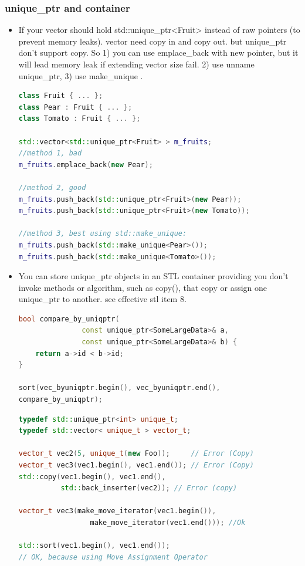 \documentclass[a4paper,12pt,twoside]{book}
\begin{document}
\subsubsection{unique\_ptr and container}
\begin{itemize}

\item If your vector should hold std::unique\_ptr<Fruit> instead of raw pointers (to prevent memory leaks). vector need copy in and copy out. but unique\_ptr don't support copy. So 1) you can use emplace\_back with new pointer, but it will lead memory leak if extending vector size fail. 2) use unname unique\_ptr, 3) use make\_unique .
\begin{lstlisting}[frame=single, language=c++]
class Fruit { ... };
class Pear : Fruit { ... };
class Tomato : Fruit { ... };

std::vector<std::unique_ptr<Fruit> > m_fruits;
//method 1, bad
m_fruits.emplace_back(new Pear);

//method 2, good
m_fruits.push_back(std::unique_ptr<Fruit>(new Pear));
m_fruits.push_back(std::unique_ptr<Fruit>(new Tomato));

//method 3, best using std::make_unique:
m_fruits.push_back(std::make_unique<Pear>());
m_fruits.push_back(std::make_unique<Tomato>());
\end{lstlisting}

\item You can store unique\_ptr objects in an STL container providing you don't invoke methods or algorithm, such as copy(), that copy or assign one unique\_ptr to another.  see effective stl item 8.

\begin{lstlisting}[frame=single, language=c++]
bool compare_by_uniqptr(
               const unique_ptr<SomeLargeData>& a,
               const unique_ptr<SomeLargeData>& b) {
    return a->id < b->id;
}

sort(vec_byuniqptr.begin(), vec_byuniqptr.end(),
compare_by_uniqptr);
\end{lstlisting}


\begin{lstlisting}[frame=single, language=c++]
typedef std::unique_ptr<int> unique_t;
typedef std::vector< unique_t > vector_t;

vector_t vec2(5, unique_t(new Foo));     // Error (Copy)
vector_t vec3(vec1.begin(), vec1.end()); // Error (Copy)
std::copy(vec1.begin(), vec1.end(),
          std::back_inserter(vec2)); // Error (copy)

vector_t vec3(make_move_iterator(vec1.begin()),
                 make_move_iterator(vec1.end())); //Ok

std::sort(vec1.begin(), vec1.end());
// OK, because using Move Assignment Operator
\end{lstlisting}

\end{itemize}
\end{document}
